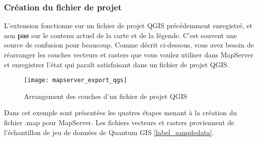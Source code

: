 \subsubsection{Création du fichier de projet}

L'extension fonctionne sur un fichier de projet QGIS précédemment enregistré, et non \textbf{pas} sur le contenu actuel de la carte et de la légende. C'est souvent une source de confusion pour beaucoup. Comme décrit ci-dessous, vous avez besoin de réarranger les couches vecteurs et rasters que vous voulez utiliser dans MapServer et enregistrer l'état qui paraît satisfaisant dans un fichier de projet QGIS.


\begin{figure}[ht]
\begin{center}
  \caption{Arrangement des couches d'un fichier de projet QGIS \nixcaption}
  \label{fig:mapserver_export_qgs}\smallskip
  \texttt{[image: mapserver\_export\_qgs]}
\end{center}
\end{figure}


Dans cet exemple sont présentées les quatres étapes menant à la création du fichier .map pour MapServer. Les fichiers vecteurs et rasters proviennent de l'échantillon de jeu de données de Quantum GIS \ref{label_sampledata}.


